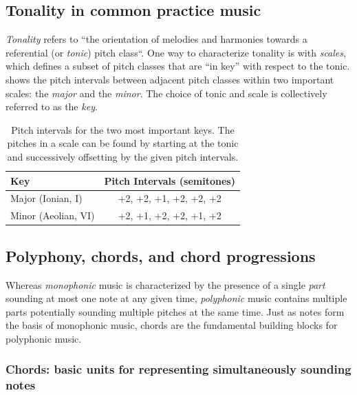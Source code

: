 \subsection{Tonality in common practice music}

\emph{Tonality} refers to ``the orientation of melodies and harmonies towards a
referential (or \emph{tonic}) pitch class``\citep{grove-tonality}. One way to
characterize tonality is with \emph{scales}, which defines a subset of pitch
classes that are ``in key'' with respect to the tonic. 
shows the pitch intervals between adjacent pitch classes within two important
scales: the \emph{major} and the \emph{minor}. The choice of tonic and scale is
collectively referred to as the \emph{key}.

\begin{table}[htpb]
    \centering
    \begin{tabular}{lc}
        \toprule
        Key & Pitch Intervals (semitones) \\
        \midrule
        Major (Ionian, I) & +2, +2, +1, +2, +2, +2 \\
        Minor (Aeolian, VI) & +2, +1, +2, +2, +1, +2 \\
        \bottomrule
    \end{tabular}
    \caption{Pitch intervals for the two most important keys\citep{freedman2015correlational}. The pitches in a scale can be found by starting at the tonic and successively offsetting by the given pitch intervals.}
    \label{tab:key-intervals}
\end{table}

\subsection{Polyphony, chords, and chord progressions}

Whereas \emph{monophonic} music is characterized by the presence of a single
\emph{part} sounding at most one note at any given time, \emph{polyphonic}
music contains multiple parts potentially sounding multiple pitches at the same
time. Just as notes form the basis of monophonic music, chords are the fundamental
building blocks for polyphonic music.

\subsubsection{Chords: basic units for representing simultaneously sounding notes}

